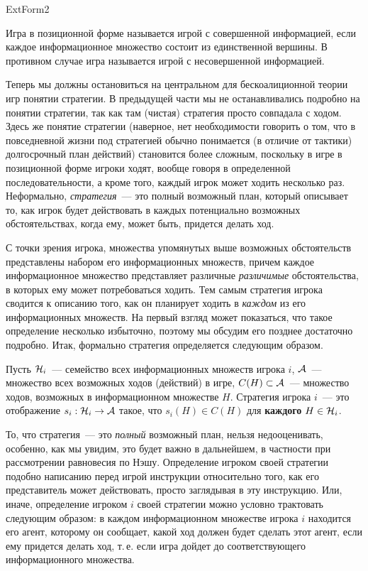 \documentclass[12pt]{article}
\begin{document}
ExtForm2


\begin{definition}
Игра в позиционной форме называется игрой с совершенной информацией,
если каждое информационное множество состоит из единственной
вершины. В противном случае игра называется игрой с несовершенной
информацией.
\end{definition}

Теперь мы должны остановиться на центральном для бескоалиционной
теории игр понятии стратегии. В предыдущей части мы не
останавливались подробно на понятии стратегии, так как там (чистая)
стратегия просто совпадала с ходом. Здесь же понятие стратегии
(наверное, нет необходимости говорить о том, что в повседневной
жизни под стратегией обычно понимается (в отличие от тактики)
долгосрочный план действий) становится более сложным, поскольку
в игре в позиционной форме игроки ходят, вообще говоря в
определенной последовательности, а кроме того, каждый игрок
может ходить несколько раз. Неформально, {\it стратегия}~--- это
полный возможный план, который описывает то, как игрок будет
действовать в каждых потенциально возможных обстоятельствах,
когда ему, может быть, придется делать ход.

С точки зрения игрока, множества упомянутых выше возможных обстоятельств
представлены набором его информационных множеств, причем каждое
информационное множество представляет различные {\it различимые}
обстоятельства, в которых ему может потребоваться ходить. Тем самым
стратегия игрока сводится к описанию того, как он планирует ходить в
{\it каждом} из его информационных множеств. На первый взгляд может
показаться, что такое определение несколько избыточно, поэтому мы
обсудим его позднее достаточно подробно. Итак, формально стратегия
определяется следующим образом.


\begin{definition}
Пусть ${\cal H}_i$~--- семейство всех информационных множеств игрока
$i$, ${\cal A}$~--- множество всех возможных ходов (действий) в
игре, $C(H)\subset {\cal A}$~---  множество ходов, возможных в
информационном множестве $H.$ Стратегия игрока $i$~--- это
отображение $s_i:{\cal H}_i\to{\cal A}$ такое, что $s_i(H)\in C(H)$
для {\bf каждого} $H\in{\cal H}_i$.
\end{definition}



То, что стратегия~--- это {\it полный} возможный план, нельзя
недооценивать, особенно, как мы увидим, это будет важно в
дальнейшем, в частности при рассмотрении равновесия по Нэшу.
Определение игроком своей стратегии подобно написанию
перед игрой инструкции относительно того, как его представитель
может действовать, просто заглядывая в эту инструкцию. Или, иначе,
определение игроком $i$ своей стратегии можно условно трактовать следующим
образом: в каждом информационном множестве игрока $i$ находится его
агент, которому он сообщает, какой ход должен будет сделать этот
агент, если ему придется делать ход, т.\,е. если игра дойдет до
соответствующего информационного множества.
\end{document}
